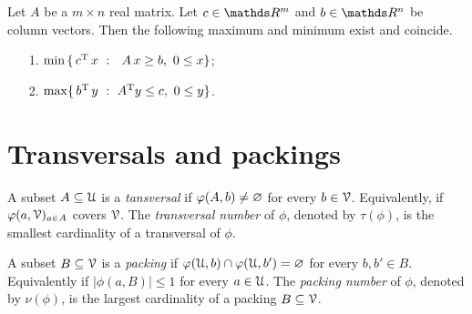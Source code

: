 \documentclass[sputnik.tex]{subfiles}
\begin{document}
\begin{proposition}
Let $A$ be a $m\times n$ real matrix. Let $c\in\RR^m$ and $b\in\RR^n$ be column vectors. Then the following maximum and minimum exist and coincide.\nobreak  
\begin{itemize}
\item[1.] $\min\,\{\,c^{\rm T}\, x\ :\ \ A\,x\ge b,\ 0\le x\}$;
\item[2.] $\max\{\,b^{\rm T}\,y\ :\ A^{\rm T}y\le c,\  0\le y\}$.\QED
\end{itemize}

\end{proposition}

% 
% 
% 
% 
% 
% 


\section{Transversals and packings}\label{Transversals_Packings}

A subset $A\subseteq\EuScript U$ is a \emph{tansversal\/} if $\varphi(A,b)\neq\varnothing$ for every $b\in\EuScript V$. Equivalently, if $\varphi(a,\EuScript V)_{a\in A}$ covers $\EuScript V$.
The \emph{transversal number\/} of $\phi$, denoted by $\tau(\phi)$, is the smallest cardinality of a transversal of $\phi$.

A subset $B\subseteq\EuScript V$ is a \emph{packing\/} if $\varphi(\EuScript U,b)\cap\varphi(\EuScript U,b')=\varnothing$ for every $b,b'\in B$. Equivalently if $|\phi(a,B)|\le1$ for every $a\in\EuScript U$.
The \emph{packing number\/} of $\phi$, denoted by $\nu(\phi)$, is the largest cardinality of a packing  $B\subseteq\EuScript V$.
\end{document}
